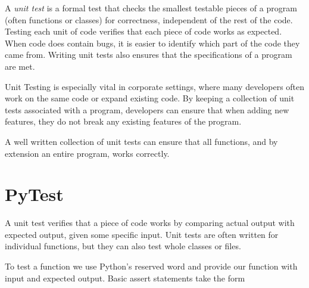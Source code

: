 


A \emph{unit test} is a formal test that checks the smallest testable pieces of a program (often functions or classes) for correctness, independent of the rest of the code.
Testing each unit of code verifies that each piece of code works as expected.
When code does contain bugs, it is easier to identify which part of the code they came from.
Writing unit tests also ensures that the specifications of a program are met.

Unit Testing is especially vital in corporate settings, where many developers often work on the same code or expand existing code.
By keeping a collection of unit tests associated with a program, developers can ensure that when adding new features, they do not break any existing features of the program.

A well written collection of unit tests can ensure that all functions, and by extension an entire program, works correctly.

\section*{PyTest} %

A unit test verifies that a piece of code works by comparing actual output with expected output, given some specific input.
Unit tests are often written for individual functions, but they can also test whole classes or files.

To test a function we use Python's reserved word  and provide our function with input and expected output. Basic assert statements take the form

